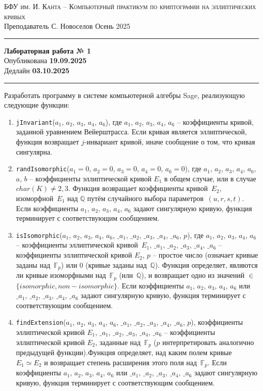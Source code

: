 \documentclass[11pt]{exam}
\theoremstyle{definition}
\begin{document}
	
	{\noindent
		\textsc{БФУ им. И. Канта -- Компьютерный практикум по криптографии на эллиптических кривых }\\[5pt]
		Преподаватель {С. Новоселов}   \hfill{Осень 2025\\}
	\hrule
	\begin{center}
		{\LARGE\textbf{
				Лабораторная работа № 1 \\[5pt]
		}} 
			Опубликована \textbf{19.09.2025} \\[5pt] 
			Дедлайн \textbf{03.10.2025}
		
	\end{center}
	\hrule \vspace{5mm}
	
	\thispagestyle{empty}
	
    Разработать программу в системе компьютерной алгебры Sage, реализующую следующие функции:

\begin{enumerate}
	\item \texttt{jInvariant}($a_1$, $a_2$, $a_3$, $a_4$, $a_6$), где $a_1$, $a_2$, $a_3$, $a_4$, $a_6$ -- коэффициенты кривой, заданной уравнением Вейерштрасса. Если кривая является эллиптической, функция возвращает $j$-инвариант кривой, иначе сообщение о том, что кривая сингулярна.
	\item \texttt{randIsomorphic}($a_1 = 0$, $a_2 = 0$, $a_3 = 0$, $a_4 = 0$, $a_6 = 0$), где $a_1$, $a_2$, $a_3$, $a_4$, $a_6$, $a$, $b$ -- коэффициенты эллиптической кривой $E_1$ в общем случае, или в случае $char(K)\neq 2, 3$. Функция возвращает коэффициенты кривой~$E_2$, изоморфной~$E_1$ над $\mathbb{Q}$ путём случайного выбора параметров~$(u, r, s, t)$. Если коэффициенты $a_1$, $a_2$, $a_3$, $a_4$, $a_6$ задают сингулярную кривую, функция терминирует с соответствующим сообщением.
	\item \texttt{isIsomorphic}($a_1$, $a_2$, $a_3$, $a_4$, $a_6$, $\_a_1$, $\_a_2$, $\_a_3$, $\_a_4$, $\_a_6$, $p$), где $a_1$, $a_2$, $a_3$, $a_4$, $a_6$ -- коэффициенты эллиптической кривой~$E_1$, $\_a_1$, $\_a_2$, $\_a_3$, $\_a_4$, $\_a_6$ -- коэффициенты эллиптической кривой $E_2$, $p$ -- простое число (означает кривые заданы над~$\mathbb{F}_p$) или $0$ (кривые заданы над~$\mathbb{Q}$). Функция определяет, являются ли кривые изоморфными над~$\mathbb{F}_p$ (или~$\mathbb{Q}$), и возвращает одно из значений $\in$ $\{isomorphic, non-isomorphic\}$. Если коэффициенты $a_1$, $a_2$, $a_3$, $a_4$, $a_6$ или $\_a_1$, $\_a_2$, $\_a_3$, $\_a_4$, $\_a_6$ задают сингулярную кривую, функция терминирует с соответствующим сообщением.
	\item \texttt{findExtension}($a_1$, $a_2$, $a_3$, $a_4$, $a_6$, $\_a_1$, $\_a_2$, $\_a_3$, $\_a_4$, $\_a_6$, $p$), коэффициенты эллиптической кривой $E_1$,
	$\_a_1$, $\_a_2$, $\_a_3$, $\_a_4$, $\_a_6$ -- коэффициенты эллиптической кривой $E_2$, заданные над~$\mathbb{F}_p$ ($p$ интерпретировать аналогично предыдущей функции).Функция определяет, над каким полем кривые~$E_1 \simeq E_2$ и возвращает степень расширения этого поля над~$\mathbb{F}_p$. Если коэффициенты $a_1$, $a_2$, $a_3$, $a_4$, $a_6$ или $\_a_1$, $\_a_2$, $\_a_3$, $\_a_4$, $\_a_6$ задают сингулярную кривую, функция терминирует с соответствующим сообщением.
\end{enumerate}

}
\end{document}
